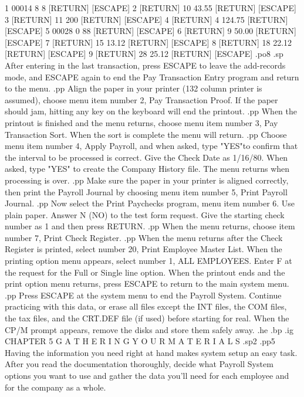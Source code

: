   1	 00014	       8	   8	   [RETURN]  [ESCAPE]
  2	[RETURN]      10	  43.55    [RETURN]  [ESCAPE]
  3	[RETURN]      11	 200	   [RETURN]  [ESCAPE]
  4	[RETURN]       4	 124.75    [RETURN]  [ESCAPE]
  5	 00028	       0	  88	   [RETURN]  [ESCAPE]
  6	[RETURN]       9	  50.00    [RETURN]  [ESCAPE]
  7	[RETURN]      15	  13.12    [RETURN]  [ESCAPE]
  8	[RETURN]      18	  22.12    [RETURN]  [ESCAPE]
  9	[RETURN]      28	  25.12    [RETURN]  [ESCAPE]
.po8
.sp
After entering in the last transaction, press ESCAPE to leave the add-records
mode,
and ESCAPE again to end the Pay Transaction
Entry program and return to the menu.
.pp
Align the paper in your printer (132 column printer is assumed), choose
menu item number 2, Pay Transaction Proof.
If the paper should jam, hitting any key
on the keyboard will end the printout.
.pp
When the printout is finished and the menu returns, choose menu item
number 3, Pay Transaction Sort.  When the sort is complete the
menu will return.
.pp
Choose menu item number 4, Apply Payroll, and when asked, type "YES"to
confirm that the interval to be processed is correct.
Give the Check Date as 1/16/80.  When asked, type "YES" to create the
Company History file.
The menu returns when processing is over.
.pp
Make sure the paper in your printer is aligned correctly, then print
the Payroll Journal by choosing menu item number 5, Print Payroll
Journal.
.pp
Now select the Print Paychecks program, menu item number 6.  Use
plain paper. Answer N (NO) to the test form request.
Give the starting check number as 1 and then press RETURN.
.pp
When the menu returns, choose item number 7, Print Check Register.
.pp
When the menu returns after the Check Register is printed,
select number 20, Print Employee Master List.  When the printing option
menu appears, select number 1, ALL EMPLOYEES.  Enter F at the request
for the Full or Single line option.  When the printout ends and the print
option menu returns, press ESCAPE to return to the main system menu.
.pp
Press ESCAPE at the system menu to end the Payroll System.
Continue practicing with this data, or erase
all files except the INT files, the COM files,
the tax files, and the CRT.DEF file
(if used) before starting for real.  When the CP/M prompt appears, remove
the disks and store them safely away.
.he
.bp
.ig
CHAPTER 5
G A T H E R I N G    Y O U R	M A T E R I A L S
.sp2
.pp5
Having the information you need right at hand makes system setup an
easy task.  After you read the documentation thoroughly, decide what
Payroll System options you want to use and gather the
data you'll need for each employee and for the company as a whole.
